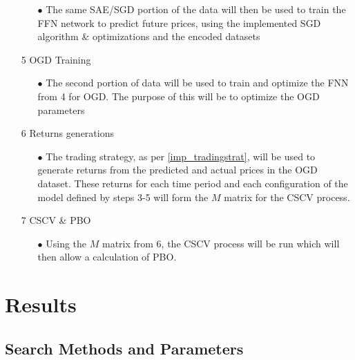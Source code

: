 \documentclass[a4paper,latin]{paper}
\begin{document}
\begin{itemize}
	\begin{itemize}
		\item[$\bullet$] The same SAE/SGD portion of the data will then be used to train the FFN network to predict future prices, using the implemented SGD algorithm \& optimizations and the encoded datasets
	\end{itemize}			
	\item [5] OGD Training
	\begin{itemize}
		\item[$\bullet$] The second portion of data will be used to train and optimize the FNN from 4 for OGD. The purpose of this will be to optimize the OGD parameters		
	\end{itemize}			
	\item [6] Returns generations
	\begin{itemize}
		\item[$\bullet$] The trading strategy, as per \ref{imp_tradingstrat}, will be used to generate returns from the predicted and actual prices in the OGD dataset. These returns for each time period and each configuration of the model defined by steps 3-5 will form the $M$ matrix for the CSCV process.
	\end{itemize}	
	\item [7] CSCV \& PBO
	\begin{itemize}
		\item[$\bullet$] Using the $M$ matrix from 6, the CSCV process will be run which will then allow a calculation of PBO.
	\end{itemize}		
\end{itemize}


\newpage
\section{Results}\label{Results}
\subsection{Search Methods and Parameters}
\end{document}
